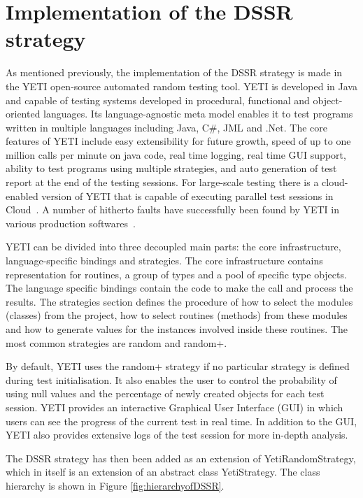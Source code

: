 \documentclass{acm_proc_article-sp}
\begin{document}
\section{Implementation of the DSSR strategy}\label{sec:imp}
As mentioned previously, the implementation of the DSSR strategy is made in the YETI open-source automated random testing tool. YETI is developed in Java and capable of testing systems developed in procedural, functional and object-oriented languages. Its language-agnostic meta model enables it to test programs written in multiple languages including Java, C\#, JML and .Net. The core features of YETI include easy extensibility for future growth, speed of up to one million calls per minute on java code, real time logging, real time GUI support, ability to test programs using multiple strategies, and auto generation of test report at the end of the testing sessions. For large-scale testing there is a cloud-enabled version of YETI that is capable of executing parallel test sessions in Cloud~\cite{Oriol2010}. A number of hitherto faults have successfully been found by YETI in various production softwares~\cite{Oriol2012, Oriol2011}.

YETI can be divided into three decoupled main parts: the core infrastructure, language-specific bindings and strategies. The core infrastructure contains representation for routines, a group of types and a pool of specific type objects. The language specific bindings contain the code to make the call and process the results. The strategies section defines the procedure of how to select the modules (classes) from the project, how to select routines (methods) from these modules and how to generate values for the instances involved inside these routines. The most common strategies are random and random+. 

By default, YETI uses the random+ strategy if no particular strategy is defined during test initialisation. It also enables the user to control the probability of using null values and the percentage of newly created objects for each test session. YETI provides an interactive Graphical User Interface (GUI) in which users can see the progress of the current test in real time. In addition to the GUI, YETI also provides extensive logs of the test session for more in-depth analysis.

The DSSR strategy has then been added as an extension of YetiRandomStrategy, which in itself is an extension of an abstract class YetiStrategy. The class hierarchy is shown in Figure \ref{fig:hierarchyofDSSR}.
\end{document}
